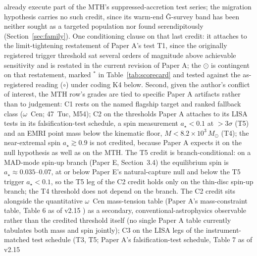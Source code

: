 \documentclass[11pt]{article}
\newcommand{\msun}{\ensuremath{M_\odot}}
\newcommand{\astar}{\ensuremath{a_\star}}
\newcommand{\shalf}{\ensuremath{\odot}} %
\newcommand{\snone}{\ensuremath{\circ}}     %
\begin{document}
\citep{Haggard2013,Chen2025JWST,Mahida2026} already execute part of the MTH's suppressed-accretion test series; the migration hypothesis carries no such credit, since its warm-end \^G-survey band has been neither sought as a targeted population nor found serendipitously (Section~\ref{sec:family}). One conditioning clause on that last credit: it attaches to the limit-tightening restatement of Paper A's test T1, since the originally registered trigger threshold sat several orders of magnitude above achievable sensitivity and is restated in the current revision of Paper A; the \shalf{} is contingent on that restatement, marked $^{*}$ in Table~\ref{tab:scorecard} and tested against the as-registered reading (\snone) under coding K4 below. Second, given the author's conflict of interest, the MTH row's grades are tied to specific Paper A artifacts rather than to judgement: C1 rests on the named flagship target and ranked fallback class ($\omega$~Cen; 47~Tuc, M54); C2 on the thresholds Paper A attaches to its LISA tests in its falsification-test schedule, a spin measurement $\astar<0.1$ at $>3\sigma$ (T5) and an EMRI point mass below the kinematic floor, $M<8.2\times10^{3}\,\msun$ (T4); the near-extremal spin $\astar\gtrsim0.9$ is not credited, because Paper A expects it on the null hypothesis as well as on the MTH. The T5 credit is branch-conditional: on a MAD-mode spin-up branch (Paper E, Section~3.4) the equilibrium spin is $\astar\approx0.035$--$0.07$, at or below Paper E's natural-capture null and below the T5 trigger $\astar<0.1$, so the T5 leg of the C2 credit holds only on the thin-disc spin-up branch; the T4 threshold does not depend on the branch. The C2 credit sits alongside the quantitative $\omega$~Cen mass-tension table (Paper A's mass-constraint table, Table 6 as of v2.15%
) as a secondary, conventional-astrophysics observable rather than the credited threshold itself (no single Paper A table currently tabulates both mass and spin jointly); C3 on the LISA legs of the instrument-matched test schedule (T3, T5; Paper A's falsification-test schedule, Table 7 as of v2.15%
\end{document}
